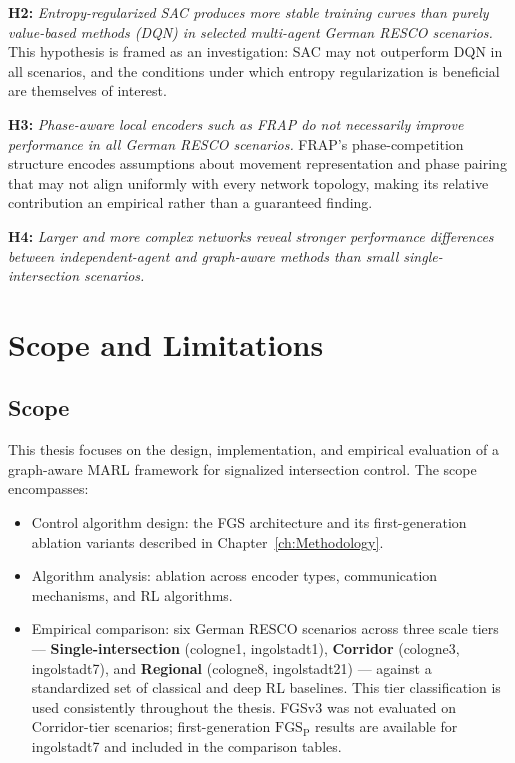 \medskip
\noindent\textbf{H2:} \textit{Entropy-regularized SAC produces more stable training curves than purely value-based methods (DQN) in selected multi-agent German RESCO scenarios.} This hypothesis is framed as an investigation: SAC may not outperform DQN in all scenarios, and the conditions under which entropy regularization is beneficial are themselves of interest.

\medskip
\noindent\textbf{H3:} \textit{Phase-aware local encoders such as FRAP do not necessarily improve performance in all German RESCO scenarios.} FRAP's phase-competition structure encodes assumptions about movement representation and phase pairing that may not align uniformly with every network topology, making its relative contribution an empirical rather than a guaranteed finding.

\medskip
\noindent\textbf{H4:} \textit{Larger and more complex networks reveal stronger performance differences between independent-agent and graph-aware methods than small single-intersection scenarios.}

\section{Scope and Limitations}
\label{sec:Introduction_ScopeAndLimitations}

\subsection{Scope}
\label{sec:Introduction_Scope}

This thesis focuses on the design, implementation, and empirical evaluation of a graph-aware MARL framework for signalized intersection control. The scope encompasses:
\begin{itemize}
  \item Control algorithm design: the FGS architecture and its first-generation ablation variants described in Chapter~\ref{ch:Methodology}.
  \item Algorithm analysis: ablation across encoder types, communication mechanisms, and RL algorithms.
  \item Empirical comparison: six German RESCO scenarios across three scale tiers — \textbf{Single-intersection} (cologne1, ingolstadt1), \textbf{Corridor} (cologne3, ingolstadt7), and \textbf{Regional} (cologne8, ingolstadt21) — against a standardized set of classical and deep RL baselines. This tier classification is used consistently throughout the thesis. FGSv3 was not evaluated on Corridor-tier scenarios; first-generation $\text{FGS}_\text{P}$ results are available for ingolstadt7 and included in the comparison tables.
\end{itemize}

